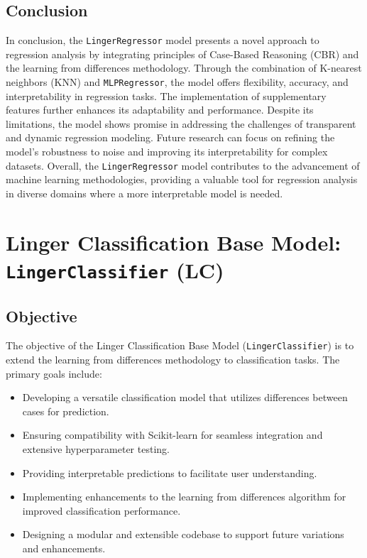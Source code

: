\documentclass[a4paper, 12pt]{report}
\begin{document}
\subsection{Conclusion}
In conclusion, the \texttt{LingerRegressor} model presents a novel approach to regression analysis by integrating principles of Case-Based Reasoning (CBR) and the learning from differences methodology. 
Through the combination of K-nearest neighbors (KNN) and \texttt{MLPRegressor}, the model offers flexibility, accuracy, and interpretability in regression tasks. 
The implementation of supplementary features further enhances its adaptability and performance. Despite its limitations, the model shows promise in addressing the challenges 
of transparent and dynamic regression modeling. Future research can focus on refining the model's robustness to noise and improving its interpretability for complex datasets. 
Overall, the \texttt{LingerRegressor} model contributes to the advancement of machine learning methodologies, providing a valuable tool for regression analysis in diverse domains where a more interpretable model is needed.


\section{Linger Classification Base Model: \texttt{LingerClassifier} (LC)}
\label{sec:linger_classification_base_model}

\subsection{Objective}
The objective of the Linger Classification Base Model (\texttt{LingerClassifier}) is to extend the learning from differences methodology to classification tasks. The primary goals include:

\begin{itemize}
    \item Developing a versatile classification model that utilizes differences between cases for prediction.
    \item Ensuring compatibility with Scikit-learn for seamless integration and extensive hyperparameter testing.
    \item Providing interpretable predictions to facilitate user understanding.
    \item Implementing enhancements to the learning from differences algorithm for improved classification performance.
    \item Designing a modular and extensible codebase to support future variations and enhancements.
\end{itemize}
\end{document}
